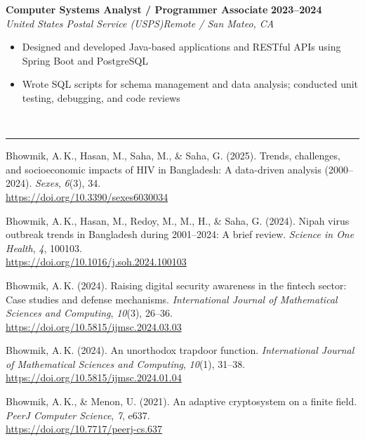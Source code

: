 \documentclass[a4paper, 11pt]{article}
\newcommand{\cvsection}[2]{%
  \vspace{14pt}%
  \noindent#1\enspace{\large\bfseries\MakeUppercase{#2}}\\[-3pt]%
  \rule{\linewidth}{1pt}%
  \vspace{5pt}\par\noindent%
}
\newcommand{\entryvspace}{\vspace{9pt}}
\begin{document}
\entryvspace

\begin{minipage}{\linewidth}
\noindent\textbf{Computer Systems Analyst / Programmer Associate}%
  \hfill\textbf{2023--2024}\\
\textit{United States Postal Service (USPS)}\hfill\textit{Remote / San Mateo, CA}
\begin{itemize}
  \item Designed and developed Java-based applications and RESTful APIs using
        Spring Boot and PostgreSQL
  \item Wrote SQL scripts for schema management and data analysis; conducted unit
        testing, debugging, and code reviews
\end{itemize}
\end{minipage}

\cvsection{\faAtom}{Selected Publications}

\begin{enumerate}[label={[\arabic*]}, itemsep=6pt, topsep=3pt]

\item Bhowmik, A.\,K., Hasan, M., Saha, M., \& Saha, G. (2025). Trends, challenges,
  and socioeconomic impacts of HIV in Bangladesh: A data-driven analysis (2000--2024).
  \textit{Sexes}, \textit{6}(3), 34.\\
  \href{https://doi.org/10.3390/sexes6030034}{https://doi.org/10.3390/sexes6030034}

\item Bhowmik, A.\,K., Hasan, M., Redoy, M., M., H., \& Saha, G. (2024). Nipah virus
  outbreak trends in Bangladesh during 2001--2024: A brief review.
  \textit{Science in One Health}, \textit{4}, 100103.\\
  \href{https://doi.org/10.1016/j.soh.2024.100103}{https://doi.org/10.1016/j.soh.2024.100103}

\item Bhowmik, A.\,K. (2024). Raising digital security awareness in the fintech sector:
  Case studies and defense mechanisms.
  \textit{International Journal of Mathematical Sciences and Computing},
  \textit{10}(3), 26--36.\\
  \href{https://doi.org/10.5815/ijmsc.2024.03.03}{https://doi.org/10.5815/ijmsc.2024.03.03}

\item Bhowmik, A.\,K. (2024). An unorthodox trapdoor function.
  \textit{International Journal of Mathematical Sciences and Computing},
  \textit{10}(1), 31--38.\\
  \href{https://doi.org/10.5815/ijmsc.2024.01.04}{https://doi.org/10.5815/ijmsc.2024.01.04}

\item Bhowmik, A.\,K., \& Menon, U. (2021). An adaptive cryptosystem on a finite field.
  \textit{PeerJ Computer Science}, \textit{7}, e637.\\
  \href{https://doi.org/10.7717/peerj-cs.637}{https://doi.org/10.7717/peerj-cs.637}

\end{enumerate}
\end{document}
